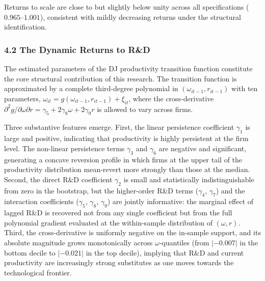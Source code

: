 \documentclass[a4paper, 12pt]{article}
\begin{document}
Returns to scale are close to but slightly below unity across all specifications ($0.965$--$1.001$), consistent with mildly decreasing returns under the structural identification.

\subsubsection{4.2 The Dynamic Returns to R\&D}

The estimated parameters of the DJ productivity transition function constitute the core structural contribution of this research. The transition function is approximated by a complete third-degree polynomial in $(\omega_{it-1}, r_{it-1})$ with ten parameters, $\omega_{it} = g(\omega_{it-1}, r_{it-1}) + \xi_{it}$, where the cross-derivative $\partial^2 g/\partial\omega\partial r = \gamma_5 + 2\gamma_8\omega + 2\gamma_9 r$ is allowed to vary across firms.

Three substantive features emerge. First, the linear persistence coefficient $\gamma_1$ is large and positive, indicating that productivity is highly persistent at the firm level. The non-linear persistence terms $\gamma_3$ and $\gamma_6$ are negative and significant, generating a concave reversion profile in which firms at the upper tail of the productivity distribution mean-revert more strongly than those at the median. Second, the direct R\&D coefficient $\gamma_2$ is small and statistically indistinguishable from zero in the bootstrap, but the higher-order R\&D terms ($\gamma_4$, $\gamma_7$) and the interaction coefficients ($\gamma_5$, $\gamma_8$, $\gamma_9$) are jointly informative: the marginal effect of lagged R\&D is recovered not from any single coefficient but from the full polynomial gradient evaluated at the within-sample distribution of $(\omega, r)$. Third, the cross-derivative is uniformly negative on the in-sample support, and its absolute magnitude grows monotonically across $\omega$-quantiles (from $|-0.007|$ in the bottom decile to $|-0.021|$ in the top decile), implying that R\&D and current productivity are increasingly strong substitutes as one moves towards the technological frontier.
\end{document}
